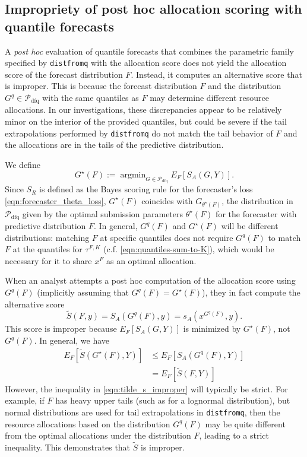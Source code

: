 \documentclass{article}\usepackage[]{graphicx}\usepackage[]{xcolor}
\DeclareMathOperator*{\argmin}{argmin}
\begin{document}
\subsection{Impropriety of post hoc allocation scoring with quantile forecasts}

A \emph{post hoc} evaluation of quantile forecasts that combines the parametric family specified by \verb`distfromq`
with the allocation score does not yield the allocation score of the forecast distribution $F$. Instead, it computes an
alternative score that is improper. This is because the forecast distribution $F$ and the distribution $G^q \in
\mathcal{P}_{\text{dfq}}$ with the same quantiles as $F$ may determine different resource allocations. In our
investigations, these discrepancies appear to be relatively minor on the interior of the provided quantiles, but could
be severe if the tail extrapolations performed by \verb`distfromq` do not match the tail behavior of $F$ and the
allocations are in the tails of the predictive distribution.

We define
$$G^{\star}(F) := \argmin_{G \in \mathcal{P}_{\mathrm{dfq}}} E_{F}[S_A(G, Y)].$$
Since $S_R$ is defined as the Bayes scoring rule for the forecaster's loss \eqref{eqn:forecaster_theta_loss}, $G^{\star}(F)$ coincides
with $G_{\theta^{\star}(F)}$, the distribution in $\mathcal{P}_{\mathrm{dfq}}$ given by the
optimal submission parameters $\theta^{\star}(F)$ for the forecaster with predictive distribution $F$.
In general, $G^q(F)$ and $G^\star(F)$ will be different distributions:  matching $F$ at specific quantiles
does not require $G^q(F)$ to match $F$ at the quantiles for $\tau^{F,K}$ (c.f. \eqref{eqn:quantiles-sum-to-K}),
which would be necessary for it to share $x^F$ as an optimal allocation.

When an analyst attempts a post hoc computation of the allocation score using $G^q(F)$ (implicitly assuming that $G^q(F)
= G^\star(F)$), they in fact compute the alternative score
$$\tilde{S}(F, y) = S_A(G^q(F), y) = s_A(x^{G^q(F)}, y).$$
This score is improper because $E_{F}[S_A(G, Y)]$ is minimized by $G^\star(F)$, not $G^q(F)$.
In general, we have
\begin{align}
E_{F}[\tilde{S}(G^\star(F), Y)] &\leq E_{F}[ S_A(G^q(F), Y) ] \label{eqn:tilde_s_improper} \\
  &= E_{F}[\tilde{S}(F, Y)] \nonumber
\end{align}
However, the inequality in \eqref{eqn:tilde_s_improper} will typically be strict. For example, if $F$ has heavy upper
tails (such as for a lognormal distribution), but normal distributions are used for tail extrapolations in
\verb`distfromq`, then the resource allocations based on the distribution $G^q(F)$ may be quite different from the
optimal allocations under the distribution $F$, leading to a strict inequality. This demonstrates that $\tilde{S}$ is
improper.


\end{document}
